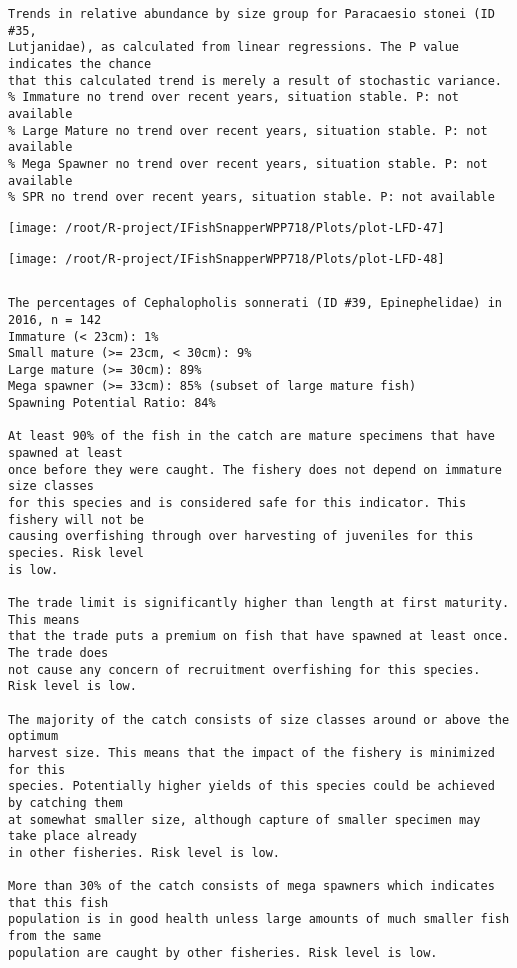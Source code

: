 \documentclass{report}\usepackage[]{graphicx}\usepackage[]{color}
\makeatletter
\def\maxwidth{ %
  \ifdim\Gin@nat@width>\linewidth
    \linewidth
  \else
    \Gin@nat@width
  \fi
}
\newenvironment{kframe}{%
 \def\at@end@of@kframe{}%
 \ifinner\ifhmode%
  \def\at@end@of@kframe{\end{minipage}}%
  \begin{minipage}{\columnwidth}%
 \fi\fi%
 \def\FrameCommand##1{\hskip\@totalleftmargin \hskip-\fboxsep
 \colorbox{shadecolor}{##1}\hskip-\fboxsep
     \hskip-\linewidth \hskip-\@totalleftmargin \hskip\columnwidth}%
 \MakeFramed {\advance\hsize-\width
   \@totalleftmargin\z@ \linewidth\hsize
   \@setminipage}}%
 {\par\unskip\endMakeFramed%
 \at@end@of@kframe}
\newenvironment{knitrout}{}{} %
\makeatother
\begin{document}
\begin{knitrout}
\begin{kframe}
\begin{verbatim}
Trends in relative abundance by size group for Paracaesio stonei (ID #35,
Lutjanidae), as calculated from linear regressions. The P value indicates the chance
that this calculated trend is merely a result of stochastic variance.
% Immature no trend over recent years, situation stable. P: not available
% Large Mature no trend over recent years, situation stable. P: not available
% Mega Spawner no trend over recent years, situation stable. P: not available
% SPR no trend over recent years, situation stable. P: not available
\end{verbatim}
\end{kframe}
\texttt{[image: /root/R-project/IFishSnapperWPP718/Plots/plot-LFD-47]} 

\texttt{[image: /root/R-project/IFishSnapperWPP718/Plots/plot-LFD-48]} 
\begin{kframe}\begin{verbatim}
\end{verbatim}
\end{kframe}
\clearpage
\newpage
\begin{kframe}\begin{verbatim}The percentages of Cephalopholis sonnerati (ID #39, Epinephelidae) in 2016, n = 142
Immature (< 23cm): 1%
Small mature (>= 23cm, < 30cm): 9%
Large mature (>= 30cm): 89%
Mega spawner (>= 33cm): 85% (subset of large mature fish)
Spawning Potential Ratio: 84%
 
At least 90% of the fish in the catch are mature specimens that have spawned at least
once before they were caught. The fishery does not depend on immature size classes
for this species and is considered safe for this indicator. This fishery will not be
causing overfishing through over harvesting of juveniles for this species. Risk level
is low.

The trade limit is significantly higher than length at first maturity.  This means
that the trade puts a premium on fish that have spawned at least once. The trade does
not cause any concern of recruitment overfishing for this species. Risk level is low.

The majority of the catch consists of size classes around or above the optimum
harvest size. This means that the impact of the fishery is minimized for this
species. Potentially higher yields of this species could be achieved by catching them
at somewhat smaller size, although capture of smaller specimen may take place already
in other fisheries. Risk level is low.

More than 30% of the catch consists of mega spawners which indicates that this fish
population is in good health unless large amounts of much smaller fish from the same
population are caught by other fisheries. Risk level is low.
 

\end{verbatim}
\end{kframe}
\end{knitrout}
\end{document}
